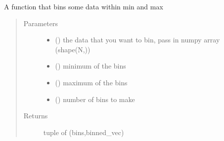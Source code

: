 \documentclass[letterpaper,10pt,english]{sphinxmanual}
\begin{document}
\begin{fulllineitems}
\label{\detokenize{wham.lib:wham.lib.wham_utils.make_bins}}
A function that bins some data within min and max
\begin{quote}\begin{description}
\item[{Parameters}] \leavevmode\begin{itemize}
\item {} 
 () \textendash{} the data that you want to bin, pass in numpy array (shape(N,))

\item {} 
 () \textendash{} minimum of the bins

\item {} 
 () \textendash{} maximum of the bins

\item {} 
 () \textendash{} number of bins to make

\end{itemize}

\item[{Returns}] \leavevmode
tuple of (bins,binned\_vec)

\end{description}\end{quote}

\end{fulllineitems}

\end{document}
